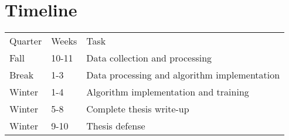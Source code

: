 \chapter{Timeline}
\begin{tabular}{ l l l }
Quarter & Weeks & Task \\
Fall & 10-11 & Data collection and processing \\
Break & 1-3 & Data processing and algorithm implementation \\ 
Winter & 1-4 & Algorithm implementation and training \\
Winter & 5-8 & Complete thesis write-up \\
Winter & 9-10 & Thesis defense
\end{tabular}